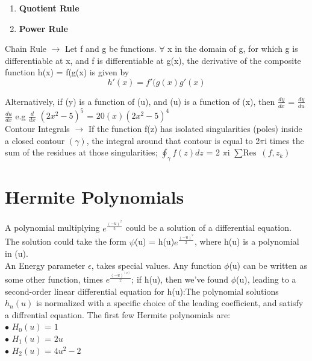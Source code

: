 \documentclass[a4paper, 10pt, onepage]{elegantbook}
\begin{document}
\begin{enumerate}
\item \textbf{Quotient Rule}
\item \textbf{Power Rule}
\end{enumerate}

Chain Rule $\rightarrow$ Let f and g be functions. $\forall$ x in the domain of g, for which g is differentiable at x, and f is differentiable at g(x), the derivative of the composite function h(x) = f(g(x) is given by
\begin{equation}
h'(x) = f'(g(x) g'(x)
\end{equation}

Alternatively, if (y) is a function of (u), and (u) is a function of (x), then $\frac{dy}{dx}$ = $\frac{dy}{du}$ $\frac{du}{dx}$ e.g $\frac{d}{dx}$ $(2x^2 - 5)^5$ = $20(x) (2x^2 - 5)^4$  \\

Contour Integrals $\rightarrow$ If the function f(z) has isolated singularities (poles) inside a closed contour $(\gamma)$, the integral around that contour is equal to
2$\pi$i times the sum of the residues at those singularities; $\oint _{\gamma} f(z) dz$ = 2 $\pi$i $\sum \text{Res}$ $(f,z_{k})$  \\

\section{Hermite Polynomials}

A polynomial multiplying $e^{\frac{(-u)^2}{2}}$ could be a solution of a differential equation. The solution could take the form $\psi$(u) = h(u)$e^{\frac{(-u)^2}{{2}}}$, where h(u) is a polynomial in (u). \\

An Energy parameter $\epsilon$, takes special values. Any function $\phi$(u) can be written as some other function, times $e^{\frac{(-u)^(2)}{2}}$; if h(u), then we've found $\phi$(u), leading to a second-order linear differential equation for h(u):The polynomial solutions $h_n(u)$ is normalized with a specific choice of the
leading coefficient, and satisfy a diffrential equation. The first few Hermite polynomials are:  \\

$\bullet$ $H_0(u)$ = $1$  \\

$\bullet$ $H_1(u)$ = $2u$  \\

$\bullet$ $H_2(u)$ = $4u^2 - 2$  \\
\end{document}
